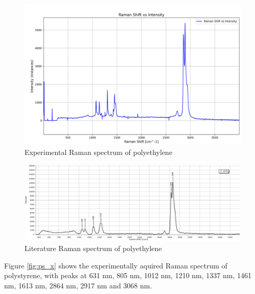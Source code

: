     \begin{figure}[h]
        \centering
        \includegraphics[width=\textwidth]{images/raman_spectra/raman_shift_polyethyleneh.png}
        \caption{Experimental Raman spectrum of polyethylene}
        \label{fig:pe_x}
    \end{figure}

    \begin{figure}[h]
        \centering
        \includegraphics[width=\textwidth]{images/lit_raman/HDPE.png}
        \caption{Literature Raman spectrum of polyethylene \cite{spectrap}}
    \end{figure}

    \newpage

    Figure \ref{fig:ps_x} shows the experimentally aquired Raman spectrum of polystyrene, with peaks at 631 nm, 805 nm, 1012 nm, 1210 nm, 1337 nm, 1461 nm, 1613 nm, 2864 nm, 2917 nm and 3068 nm.

    \newpage

